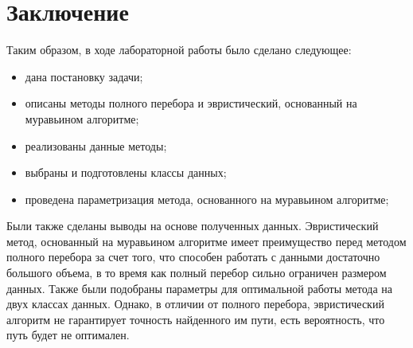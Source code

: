 \chapter*{Заключение}

Таким образом, в ходе лабораторной работы было сделано следующее:
\begin{itemize}
	\item дана постановку задачи;
	\item описаны методы полного перебора и эвристический, основанный на муравьином алгоритме;
	\item реализованы данные методы;
	\item выбраны и подготовлены классы данных;
	\item проведена параметризация метода, основанного на муравьином алгоритме;
\end{itemize}

Были также сделаны выводы на основе полученных данных.
Эвристический метод, основанный на муравьином алгоритме имеет преимущество перед методом полного перебора за счет того, что способен работать с данными достаточно большого объема, в то время как полный перебор сильно ограничен размером данных.
Также были подобраны параметры для оптимальной работы метода на двух классах данных.
Однако, в отличии от полного перебора, эвристический алгоритм не гарантирует точность найденного им пути, есть вероятность, что путь будет не оптимален.
